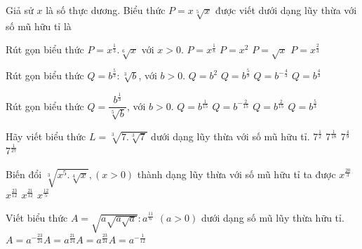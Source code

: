 \begin{ex}
	Giả sử $x$ là số thực dương. Biểu thức $P=x \sqrt[5]x$ được viết dưới dạng lũy thừa với số mũ hữu tỉ là
\end{ex}


\begin{ex}
	Rút gọn biểu thức $P=x^{\tfrac{1}{3}}.\sqrt[6]{x}$ với $x>0$.
	\choice
	{$P=x^{\tfrac{1}{8}}$}
	{$P=x^2$}
	{\True $P=\sqrt{x}$}
	{$P=x^{\tfrac{2}{3}}$}
\end{ex}

\begin{ex}
	Rút gọn biểu thức $Q = b^{\frac{5}{3}} : \sqrt[3]{b}$, với $b > 0$.
	\choice
	{$Q = b^2$}
	{$Q = b^{\tfrac{5}{9}}$}
	{$Q = b^{-\tfrac{4}{3}}$}
	{\True $Q = b^{\tfrac{4}{3}}$}
\end{ex}

\begin{ex}
	Rút gọn biểu thức $Q=\dfrac{b^{\frac{1}{3}}}{\sqrt[5]{b}}$, với $b>0$.
	\choice
	{$Q=b^{\frac{1}{15}}$}
	{$Q=b^{-\frac{2}{15}}$}
	{\True $Q=b^{\frac{2}{15}}$}
	{$Q=b^{\frac{5}{3}}$}
\end{ex}

\begin{ex}
	Hãy viết biểu thức $L=\sqrt[3]{7.\sqrt[3]{7}}$ dưới dạng lũy thừa với số mũ hữu tỉ.
	\choice
	{$7^\frac{1}{2}$}
	{$7^{\frac{1}{18}}$}
	{\True $7^{\frac{4}{9}}$}
	{$7^{\frac{1}{27}}$}
\end{ex}

\begin{ex}
	Biến đổi $\sqrt[3]{x^5.\sqrt[4]{x}}, \left(x>0\right)$ thành dạng lũy thừa với số mũ hữu tỉ ta được
	\choice
	{${x}^{\tfrac{20}{3}}$}
	{${x}^{\tfrac{23}{12}}$}
	{\True ${x}^{\tfrac{21}{12}}$}
	{${x}^{\tfrac{12}{5}}$}
\end{ex}

\begin{ex}
	Viết biểu thức $A=\sqrt{a\sqrt{a\sqrt{a}}}:a^{\tfrac{11}{6}}$ $(a>0)$ dưới dạng số mũ lũy thừa hữu tỉ.
	\choice
	{\True $A=a^{-\tfrac{23}{24}}$}{$A=a^{\tfrac{21}{24}}$}{$A=a^{\tfrac{23}{24}}$}{$A=a^{-\tfrac{1}{12}}$}
\end{ex}

